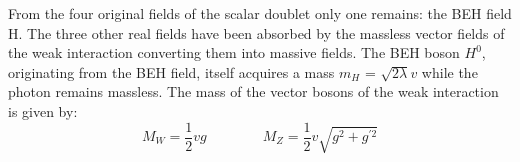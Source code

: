 From the four original fields of the scalar doublet only one remains: the BEH field H. The three other real fields have been absorbed by the massless vector fields of the weak interaction converting them into massive fields.
The BEH boson $H^{0}$, originating from the BEH field, itself acquires a mass $m_{H}$ = $\sqrt{2 \lambda}v$ while the photon remains massless. The mass of the vector bosons of the weak interaction is given by: %
\begin{equation}\label{eq::VectorBosonMasses}
 M_W = \frac{1}{2} v g \qquad \qquad M_Z = \frac{1}{2} v \sqrt{g^2 + g^{'2}}
\end{equation}

